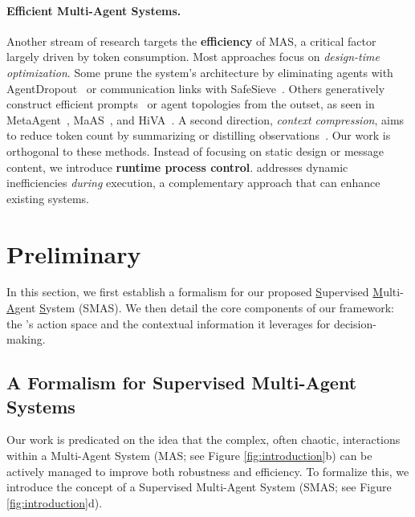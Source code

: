 \paragraph{Efficient Multi-Agent Systems.}
Another stream of research targets the \textbf{efficiency} of MAS, a critical factor largely driven by token consumption. Most approaches focus on \emph{design-time optimization}. Some prune the system's architecture by eliminating agents with AgentDropout~\citep{wang2025agentdropoutdynamicagentelimination} or communication links with SafeSieve~\citep{zhang2025safesieveheuristicsexperienceprogressive}. Others generatively construct efficient prompts~\citep{han2025mapgdmultiagentpromptgradient} or agent topologies from the outset, as seen in MetaAgent~\citep{zhang2025metaagentautomaticallyconstructingmultiagent}, MaAS~\citep{zhang2025agentic-supernet}, and HiVA~\citep{tang2025hivaselforganizedhierarchicalvariable}. A second direction, \emph{context compression}, aims to reduce token count by summarizing or distilling observations~\citep{chen2025smurfs,mou2025ecolangefficienteffectiveagent}. Our work is orthogonal to these methods. Instead of focusing on static design or message content, we introduce \textbf{runtime process control}. \method addresses dynamic inefficiencies \emph{during} execution, a complementary approach that can enhance existing systems.



\section{Preliminary}
\label{sec:preliminary}
In this section, we first establish a formalism for our proposed \underline{S}upervised \underline{M}ulti-\underline{A}gent \underline{S}ystem (SMAS).
We then detail the core components of our framework: the \method's action space and the contextual information it leverages for decision-making.

\subsection{A Formalism for Supervised Multi-Agent Systems}
\label{sec:smas_formalism}
Our work is predicated on the idea that the complex, often chaotic, interactions within a Multi-Agent System (MAS; see Figure \ref{fig:introduction}b) can be actively managed to improve both robustness and efficiency.
To formalize this, we introduce the concept of a {Supervised Multi-Agent System} (SMAS; see Figure \ref{fig:introduction}d).


